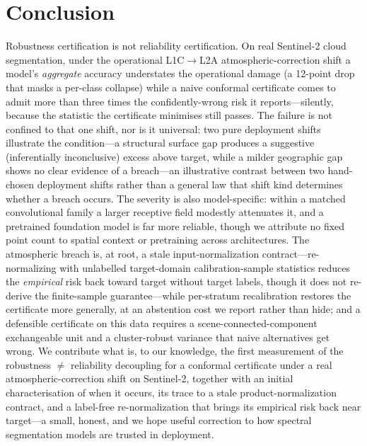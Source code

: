 \documentclass[preprint,3p,times]{elsarticle}
\begin{document}
\section{Conclusion}
Robustness certification is not reliability certification. On real Sentinel-2 cloud segmentation, under the operational L1C$\to$L2A atmospheric-correction shift a model's \emph{aggregate} accuracy understates the operational damage (a 12-point drop that masks a per-class collapse) while a naive conformal certificate comes to admit more than three times the confidently-wrong risk it reports---silently, because the statistic the certificate minimises still passes. The failure is not confined to that one shift, nor is it universal: two pure deployment shifts illustrate the condition---a structural surface gap produces a suggestive (inferentially inconclusive) excess above target, while a milder geographic gap shows no clear evidence of a breach---an illustrative contrast between two hand-chosen deployment shifts rather than a general law that shift kind determines whether a breach occurs. The severity is also model-specific: within a matched convolutional family a larger receptive field modestly attenuates it, and a pretrained foundation model is far more reliable, though we attribute no fixed point count to spatial context or pretraining across architectures. The atmospheric breach is, at root, a stale input-normalization contract---re-normalizing with unlabelled target-domain calibration-sample statistics reduces the \emph{empirical} risk back toward target without target labels, though it does not re-derive the finite-sample guarantee---while per-stratum recalibration restores the certificate more generally, at an abstention cost we report rather than hide; and a defensible certificate on this data requires a scene-connected-component exchangeable unit and a cluster-robust variance that naive alternatives get wrong. We contribute what is, to our knowledge, the first measurement of the robustness $\neq$ reliability decoupling for a conformal certificate under a real atmospheric-correction shift on Sentinel-2, together with an initial characterisation of when it occurs, its trace to a stale product-normalization contract, and a label-free re-normalization that brings its empirical risk back near target---a small, honest, and we hope useful correction to how spectral segmentation models are trusted in deployment.
\end{document}
